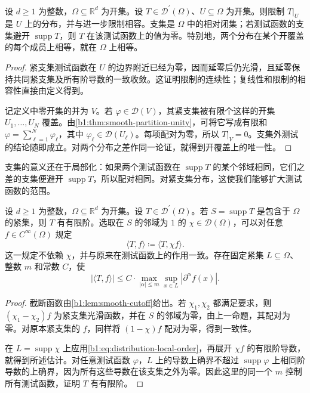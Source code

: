 \begin{proposition}\label{b1:prop:distribution-locality}
设 \(d\geq1\) 为整数，\(\Omega\subseteq\mathbb R^d\) 为开集。设 \(T\in\mathcal D^{\prime}(\Omega)\)、\(U\subseteq\Omega\) 为开集。则限制 \(T|_U\) 是 \(U\) 上的分布，并与进一步限制相容。支集是 \(\Omega\) 中的相对闭集；若测试函数的支集避开 \(\operatorname{supp}T\)，则 \(T\) 在该测试函数上的值为零。特别地，两个分布在某个开覆盖的每个成员上相等，就在 \(\Omega\) 上相等。
\end{proposition}
\begin{proof}
紧支集测试函数在 \(U\) 的边界附近已经为零，因而延零后仍光滑，且延零保持共同紧支集及所有阶导数的一致收敛。这证明限制的连续性；复线性和限制的相容性直接由定义得到。

记定义中零开集的并为 \(V\)。若 \(\varphi\in\mathcal D(V)\)，其紧支集被有限个这样的开集 \(U_1,\ldots,U_N\) 覆盖。由\cref{b1:thm:smooth-partition-unity}，可将它写成有限和 \(\varphi=\sum_{\ell=1}^N\varphi_\ell\)，其中 \(\varphi_\ell\in\mathcal D(U_\ell)\)。每项配对为零，所以 \(T|_V=0\)。支集外测试的结论随即成立。对两个分布之差作同一论证，就得到开覆盖上的唯一性。
\end{proof}

支集的意义还在于局部化：如果两个测试函数在 \(\operatorname{supp}T\) 的某个邻域相同，它们之差的支集便避开 \(\operatorname{supp}T\)，所以配对相同。对紧支集分布，这使我们能够扩大测试函数的范围。

\begin{corollary}\label{b1:cor:compact-distribution-smooth-action}
设 \(d\geq1\) 为整数，\(\Omega\subseteq\mathbb R^d\) 为开集。设 \(T\in\mathcal D^{\prime}(\Omega)\)。若 \(S=\operatorname{supp}T\) 是包含于 \(\Omega\) 的紧集，则 \(T\) 有有限阶。选取在 \(S\) 的邻域为 \(1\) 的 \(\chi\in\mathcal D(\Omega)\)，可以对任意 \(f\in C^\infty(\Omega)\) 规定
\[
 \langle T,f\rangle\coloneqq\langle T,\chi f\rangle.
\]
这一规定不依赖 \(\chi\)，并与原来在测试函数上的作用一致。存在固定紧集 \(L\subseteq\Omega\)、整数 \(m\) 和常数 \(C\)，使
\[
 |\langle T,f\rangle|
 \leq C\cdot\max_{|\alpha|\leq m}\sup_{x\in L}|\partial^\alpha f(x)|.
\]
\end{corollary}
\begin{proof}
截断函数由\cref{b1:lem:smooth-cutoff}给出。若 \(\chi_1,\chi_2\) 都满足要求，则 \((\chi_1-\chi_2)f\) 为紧支集光滑函数，并在 \(S\) 的邻域为零，由上一命题，其配对为零。对原本紧支集的 \(f\)，同样将 \((1-\chi)f\) 配对为零，得到一致性。

在 \(L=\operatorname{supp}\chi\) 上应用\eqref{b1:eq:distribution-local-order}，再展开 \(\chi f\) 的有限阶导数，就得到所述估计。对任意测试函数 \(\varphi\)，\(L\) 上的导数上确界不超过 \(\operatorname{supp}\varphi\) 上相同阶导数的上确界，因为所有这些导数在该支集之外为零。因此这里的同一个 \(m\) 控制所有测试函数，证明 \(T\) 有有限阶。
\end{proof}

